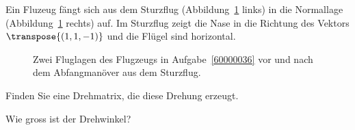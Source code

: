 Ein Fluzeug fängt sich aus dem Sturzflug
(Abbildung~\ref{60000036:fig} links)
in die Normallage
(Abbildung~\ref{60000036:fig} rechts)
auf.
Im Sturzflug zeigt die Nase in die Richtung des Vektors
$\transpose{(1,1,-1)}$ und die Flügel sind horizontal.
\begin{figure}[ht]
\centering
{}
\caption{
Zwei Fluglagen des Flugzeugs in Aufgabe~\ref{60000036}
vor und nach dem Abfangmanöver aus dem Sturzflug.
\label{60000036:fig}}
\end{figure}
\begin{teilaufgaben}
\item Finden Sie eine Drehmatrix, die diese Drehung erzeugt.
\item Wie gross ist der Drehwinkel?
\end{teilaufgaben}

